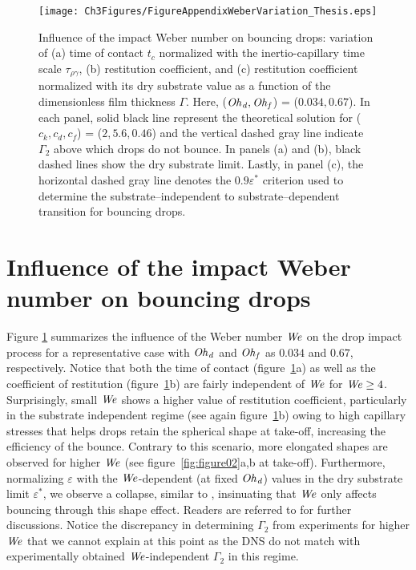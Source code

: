\begin{subappendices}
	\begin{sidewaysfigure}
		\centering
		\texttt{[image: Ch3Figures/FigureAppendixWeberVariation\_Thesis.eps]}
		\caption{Influence of the impact Weber number on bouncing drops: variation of (a) time of contact $t_c$ normalized with the inertio-capillary time scale $\tau_{\rho\gamma}$, (b) restitution coefficient, and (c) restitution coefficient normalized with its dry substrate value as a function of the dimensionless film thickness $\Gamma$. Here, ($\mathit{Oh}_\mathit{d}, \mathit{Oh}_\mathit{f}$) = ($0.034, 0.67$). In each panel, solid black line represent the theoretical solution for ($c_k, c_d, c_f$) = ($2, 5.6, 0.46$) and the vertical dashed gray line indicate $\Gamma_2$ above which drops do not bounce. In panels (a) and (b), black dashed lines show the dry substrate limit. Lastly, in panel (c), the horizontal dashed gray line denotes the $0.9\varepsilon^*$ criterion used to determine the substrate--independent to substrate--dependent transition for bouncing drops.}
		\label{fig:appendix_WeberVariation}
	\end{sidewaysfigure}

	\section{Influence of the impact Weber number on bouncing drops}
	\label{sec:weber_influence}
	
	Figure \ref{fig:appendix_WeberVariation} summarizes the influence of the Weber number $\mathit{We}$ on the drop impact process for a representative case with $\mathit{Oh}_\mathit{d}$ and $\mathit{Oh}_\mathit{f}$ as $0.034$ and $0.67$, respectively. Notice that both the time of contact (figure~\ref{fig:appendix_WeberVariation}a) as well as the coefficient of restitution (figure~\ref{fig:appendix_WeberVariation}b) are fairly independent of $\mathit{We}$ for $\mathit{We} \ge 4$. Surprisingly, small $\mathit{We}$ shows a higher value of restitution coefficient, particularly in the substrate independent regime (see again figure~\ref{fig:appendix_WeberVariation}b) owing to high capillary stresses that helps drops retain the spherical shape at take-off, increasing the efficiency of the bounce. Contrary to this scenario, more elongated shapes are observed for higher $\mathit{We}$ (see figure~\ref{fig:figure02}a,b at take-off). Furthermore, normalizing $\varepsilon$ with the $\mathit{We}$-dependent (at fixed $\mathit{Oh}_\mathit{d}$) values in the dry substrate limit $\varepsilon^*$, we observe a collapse, similar to \citet{jha2020viscous}, insinuating that $\mathit{We}$ only affects bouncing through this shape effect. Readers are referred to \citet{vatsalInProgressViscous} for further discussions. Notice the discrepancy in determining $\Gamma_2$ from experiments for higher $\mathit{We}$ that we cannot explain at this point as the DNS do not match with experimentally obtained $\mathit{We}$-independent $\Gamma_2$ in this regime.
	

\end{subappendices}

